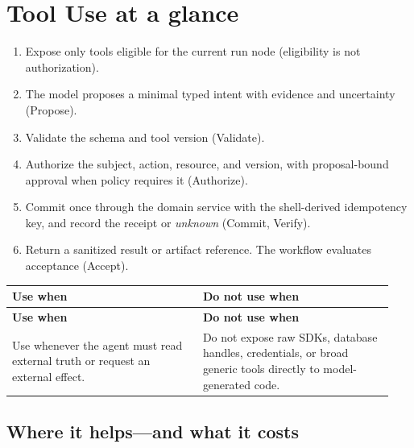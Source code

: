 \section{Tool Use at a glance}

\begin{enumerate}

\item Expose only tools eligible for the current run node (eligibility is not authorization).

\item The model proposes a minimal typed intent with evidence and uncertainty (Propose).

\item Validate the schema and tool version (Validate).

\item Authorize the subject, action, resource, and version, with proposal-bound approval when policy requires it (Authorize).

\item Commit once through the domain service with the shell-derived idempotency key, and record the receipt or \emph{unknown} (Commit, Verify).

\item Return a sanitized result or artifact reference. The workflow evaluates acceptance (Accept).

\end{enumerate}

\BookTableStart
\small
\begin{longtable}{@{}Y{0.4700\linewidth}Y{0.4700\linewidth}@{}}
\color{white}\bfseries \textbf{Use when} & \color{white}\bfseries \textbf{Do not use when} \\
\endfirsthead
{}
\color{white}\bfseries \textbf{Use when} & \color{white}\bfseries \textbf{Do not use when} \\
\endhead
Use whenever the agent must read external truth or request an external effect. & Do not expose raw SDKs, database handles, credentials, or broad generic tools directly to model-generated code. \\
\end{longtable}
\BookTableEnd

\subsection{Where it helps—and what it costs}


